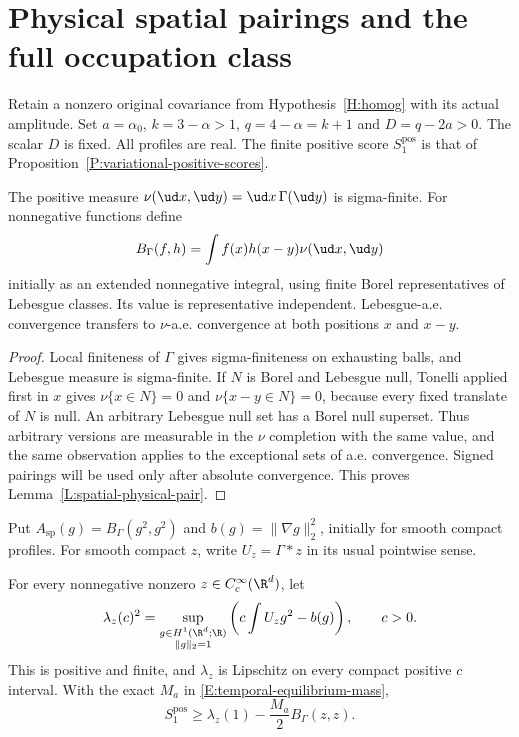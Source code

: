 \section{Physical spatial pairings and the full occupation class}
\label{S:spatial-occupation-foundation}

Retain a nonzero original covariance from Hypothesis~\ref{H:homog}
with its actual amplitude. Set $a=\alpha_0$,
$k=3-\alpha>1$, $q=4-\alpha=k+1$ and $D=q-2a>0$.
The scalar $D$ is fixed. All profiles are real.
The finite positive score $S_1^{\mathrm{pos}}$ is that of
Proposition~\ref{P:variational-positive-scores}.

\begin{lemma}\label{L:spatial-physical-pair}
  The positive measure $\nu(\ud x,\ud y)=\ud x\,\Gamma(\ud y)$ is
  sigma-finite. For nonnegative functions define
  \begin{equation}\label{E:spatial-physical-pair}
    B_\Gamma(f,h)=\int f(x)h(x-y)\nu(\ud x,\ud y)
  \end{equation}
  initially as an extended nonnegative integral, using finite Borel
  representatives of Lebesgue classes. Its value is representative
  independent. Lebesgue-a.e. convergence transfers to $\nu$-a.e.
  convergence at both positions $x$ and $x-y$.
\end{lemma}

\begin{proof}
  Local finiteness of $\Gamma$ gives sigma-finiteness on exhausting
  balls, and Lebesgue measure is sigma-finite.
  If $N$ is Borel and Lebesgue null, Tonelli applied first in $x$
  gives $\nu\{x\in N\}=0$ and $\nu\{x-y\in N\}=0$, because
  every fixed translate of $N$ is null.
  An arbitrary Lebesgue null set has a Borel null superset.
  Thus arbitrary versions are measurable in the $\nu$ completion
  with the same value, and the same observation applies to the
  exceptional sets of a.e. convergence.
  Signed pairings will be used only after absolute convergence.
  This proves Lemma~\ref{L:spatial-physical-pair}.
\end{proof}

Put $A_{\mathrm{sp}}(g)=B_\Gamma(g^2,g^2)$ and
$b(g)=\|\nabla g\|_2^2$, initially for smooth compact profiles.
For smooth compact $z$, write $U_z=\Gamma*z$ in its usual
pointwise sense.

\begin{lemma}\label{L:spatial-static-controls}
  For every nonnegative nonzero $z\in C_c^\infty(\R^d)$, let
  \[
    \lambda_z(c)^2=
    \sup_{\substack{g\in H^1(\R^d;\R)\\\|g\|_2=1}}
    \left(c\int U_zg^2-b(g)\right),\qquad c>0.
  \]
  This is positive and finite, and $\lambda_z$ is Lipschitz on
  every compact positive $c$ interval. With the exact $M_a$ in
  \eqref{E:temporal-equilibrium-mass},
  \begin{equation}\label{E:spatial-static-score}
    S_1^{\mathrm{pos}}\ge
    \lambda_z(1)-\frac{M_a}{2}B_\Gamma(z,z).
  \end{equation}
\end{lemma}

